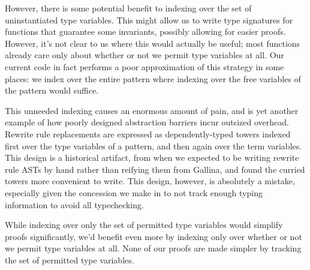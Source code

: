 However, there is some potential benefit to indexing over the set of uninstantiated type variables.
This might allow us to write type signatures for functions that guarantee some invariants, possibly allowing for easier proofs.
However, it's not clear to us where this would actually be useful; most functions already care only about whether or not we permit type variables at all.
Our current code in fact performs a poor approximation of this strategy in some places: we index over the entire pattern where indexing over the free variables of the pattern would suffice.

This unneeded indexing causes an enormous amount of pain, and is yet another example of how poorly designed abstraction barriers incur outsized overhead.
Rewrite rule replacements are expressed as dependently-typed towers indexed first over the type variables of a pattern, and then again over the term variables.
This design is a historical artifact, from when we expected to be writing rewrite rule ASTs by hand rather than reifying them from Gallina, and found the curried towers more convenient to write.
This design, however, is absolutely a mistake, especially given the concession we make in  to not track enough typing information to avoid all typechecking.

While indexing over only the set of permitted type variables would simplify proofs significantly, we'd benefit even more by indexing only over whether or not we permit type variables at all.
None of our proofs are made simpler by tracking the set of permitted type variables.
%
%
%

